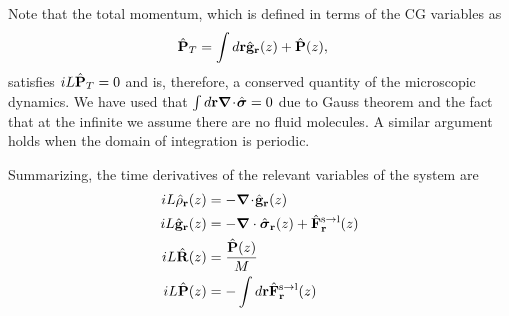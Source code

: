 \documentclass[b5paper,openright,10pt]{book}
\newcommand{\esc}{\!\cdot\!}
\begin{document}
Note  that the  total  momentum,  which is  defined  in  terms of  the
CG variables as
\begin{align}
  \hat{\bf P}_T&=\int d{\bf r} \hat{\bf g}_{\bf r}(z)+\hat{\bf P}(z),
\end{align}
satisfies $ iL\hat{\bf P}_T=0$ and is, therefore, a conserved quantity
of  the  microscopic   dynamics.   We  have  used   that  $\int  d{\bf
r}\boldsymbol{\nabla}\esc\hat{\boldsymbol{\sigma}}=0$ due to  Gauss theorem  and the  fact
that at the infinite we assume there are no fluid molecules. A similar
argument holds when the domain of integration is periodic.


Summarizing, the time derivatives of the relevant variables of the system are
\begin{align}
    iL \hat{\rho}_{\bf r}(z) &= -\boldsymbol{\nabla}\esc\hat{\bf g}_{\bf r}(z)
\nonumber\\
iL\hat{\bf g}_{\bf r}(z)
    &=-\boldsymbol{\nabla}\cdot \hat{\boldsymbol{\sigma}}_{\bf r}(z)+\hat{{\bf F}}^{\rm s\to l}_{\bf r}(z) \nonumber \\
    iL\hat{\bf R}(z) &=\frac{\hat{\bf P}(z)}{M}
  \nonumber\\
    iL\hat{\bf P}(z) &=-\int  d{\bf r} \hat{\bf F}^{\rm s\to l}_{\bf r}(z)
   \label{timeDerivatives}  
\end{align}
\end{document}
